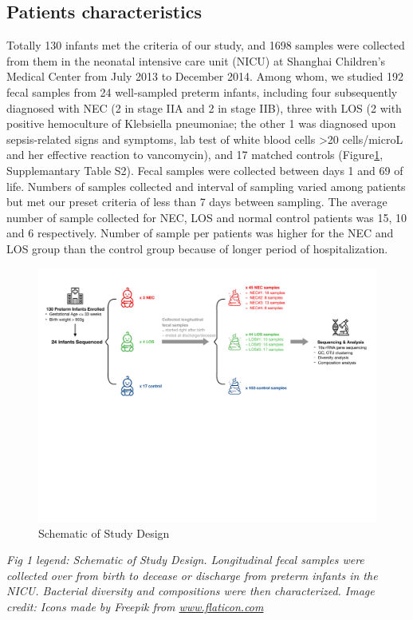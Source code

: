 \documentclass[fleqn,10pt]{wlpeerj} %
\begin{document}
  \subsection*{Patients characteristics}
   Totally 130 infants met the criteria of our study, and 1698 samples were collected from them in the neonatal intensive care unit (NICU) at Shanghai Children’s Medical Center from July 2013 to December 2014.  Among whom, we studied 192 fecal samples from 24 well-sampled preterm infants, including four subsequently diagnosed with NEC (2 in stage IIA and 2 in stage IIB), three with LOS (2 with positive hemoculture of Klebsiella pneumoniae; the other 1 was diagnosed upon sepsis-related signs and symptoms, lab test of white blood cells >20 cells/microL and her effective reaction to vancomycin), and 17 matched controls (Figure\ref{fig:design}, Supplemantary Table S2). Fecal samples were collected between days 1 and 69 of life. Numbers of samples collected and interval of sampling varied among patients but met our preset criteria of less than 7 days between sampling. The average number of sample collected for NEC, LOS and normal control patients was 15, 10 and 6 respectively.  Number of sample per patients was higher for the NEC and LOS group than the control group because of longer period of hospitalization. \\
     \begin{figure}[ht]\centering
       \includegraphics[width=\linewidth]{figure/sheme.pdf}
       \caption{Schematic of Study Design}
       \label{fig:design}
     \end{figure}

     \emph{Fig 1 legend: Schematic of Study Design. Longitudinal fecal samples were collected over from birth to decease or discharge from preterm infants in the NICU. Bacterial diversity and compositions were then characterized. Image credit: Icons made by Freepik from \href{www.flaticon.com}{www.flaticon.com}}
\end{document}
